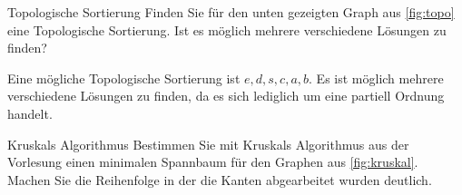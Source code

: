 \documentclass{article}
\begin{document}
\begin{exercise}{Topologische Sortierung}
  Finden Sie für den unten gezeigten Graph aus \ref{fig:topo} eine Topologische Sortierung. Ist es möglich mehrere verschiedene Lösungen zu finden?
  

  \begin{solution}
    Eine mögliche Topologische Sortierung ist $e, d, s, c, a, b$. Es ist möglich mehrere verschiedene Lösungen zu finden, da es sich lediglich um eine partiell Ordnung handelt.
  \end{solution}
\end{exercise}

\begin{exercise}{Kruskals Algorithmus}
  Bestimmen Sie mit Kruskals Algorithmus aus der Vorlesung einen minimalen Spannbaum für den Graphen aus \ref{fig:kruskal}. Machen Sie die Reihenfolge in der die Kanten abgearbeitet wurden deutlich.
  

  \begin{solution}\end{solution}
\end{exercise}
\end{document}
